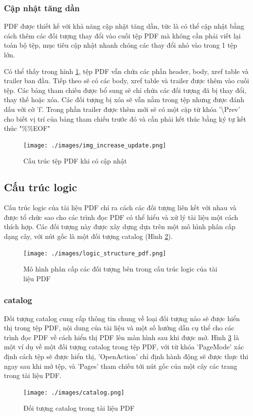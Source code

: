 \documentclass[./../main.tex]{subfiles}
\begin{document}
\subsubsection*{Cập nhật tăng dần}
PDF được thiết kế với khả năng cập nhật tăng dần, tức là có thể cập nhật bằng cách thêm các đối tượng thay đổi vào cuối tệp PDF mà không cần phải viết lại toàn bộ tệp, mục tiêu cập nhật nhanh chóng các thay đổi nhỏ vào trong 1 tệp lớn.

Có thể thấy trong hình \ref{fig:update}, tệp PDF vẫn chứa các phần header, body, xref table và trailer ban đầu. Tiếp theo sẽ có các body, xref table và trailer được thêm vào cuối tệp. Các bảng tham chiếu được bổ sung sẽ chỉ chứa các đối tượng đã bị thay đổi, thay thế  hoặc xóa. Các đối tượng bị xóa sẽ vẫn nằm trong tệp nhưng được đánh dấu với cờ 'f'.  Trong phần trailer được thêm mới sẽ có một cặp từ khóa '\textbackslash Prev' cho biết vị trí của bảng tham chiếu trước đó và cần phải kết thúc bằng ký tự kết thúc "\%\%EOF"
\begin{figure}[ht!]
	\centering
	\texttt{[image: ./images/img\_increase\_update.png]}
	\caption{Cấu trúc tệp PDF khi có cập nhật }
	\label{fig:update}
\end{figure}
\subsection{Cấu trúc logic}

Cấu trúc logic của tài liệu PDF chỉ ra cách các đối tượng liên kết với nhau và được tổ chức sao cho các trình đọc PDF có thể hiểu và xử lý tài liệu một cách thích hợp. Các đối tượng này được xây dựng dựa trên một mô hình phân cấp dạng cây, với nút gốc là một đối tượng catalog (Hình \ref{fig:logic_structure}).

\begin{figure}[ht!]
	\centering
	\texttt{[image: ./images/logic\_structure\_pdf.png]}
	\caption{Mô hình phân cấp các đối tượng bên trong cấu trúc logic của tài liệu PDF \protect\footnotemark}
	\label{fig:logic_structure}
\end{figure}


\subsubsection*{catalog}
Đối tượng catalog cung cấp thông tin chung về loại đối tượng nào sẽ được hiển thị trong tệp PDF, nội dung của tài liệu và một số hướng dẫn cụ thể cho các trình đọc PDF về cách hiển thị PDF lên màn hình sau khi được mở. Hình \ref{fig:catalog} là một ví dụ về một đối tượng catalog trong tệp PDF, với từ khóa 'PageMode' xác định cách tệp sẽ được hiển thị, 'OpenAction' chỉ định hành động sẽ được thực thi ngay sau khi mở tệp, và 'Pages' tham chiếu tới nút gốc của một cây các trang trong tài liệu PDF.
\begin{figure}[ht!]
	\centering
	\texttt{[image: ./images/catalog.png]}
	\caption{Đối tượng catalog trong tài liệu PDF}
	\label{fig:catalog}
\end{figure}
\end{document}
